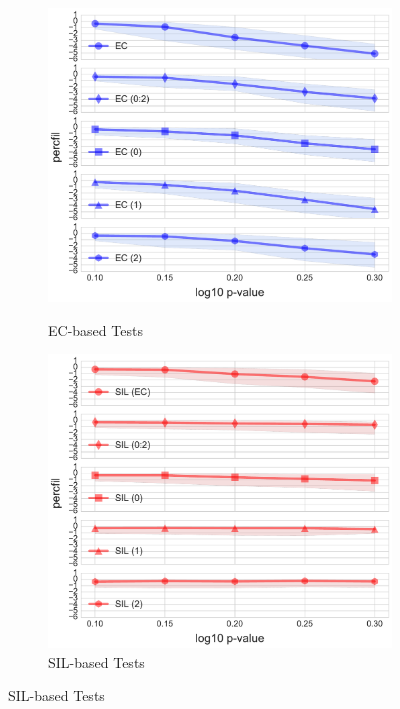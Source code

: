 \documentclass[12pt]{article}
\begin{document}
\begin{center}
  \begin{figure}[htp!]
    \centering
    \begin{subfigure}{.45\textwidth}
      \centering
      \caption{EC-based Tests}
      \includegraphics[width=\linewidth]{sub_euler_lineplot_log10_norm_False.pdf}
      \label{fig:sub_euler}
    \end{subfigure}
    \begin{subfigure}{.45\textwidth}
      \centering
      \caption{SIL-based Tests}
      \includegraphics[width=\linewidth]{sub_silh_lineplot_log10_norm_False.pdf}

\end{subfigure}
\end{figure}
\end{center}
\end{document}
